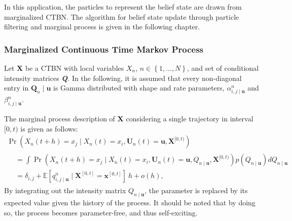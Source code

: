 In this application, the particles to represent the belief state are drawn from marginalized CTBN. The algorithm for belief state update through particle filtering and marginal process is given in the following chapter.
\subsubsection{Marginalized Continuous Time Markov Process}
Let \textbf{X} be a CTBN with local variables $ X_n $, $ n\in \left\lbrace 1,...,N \right\rbrace $, and set of conditional intensity matrices \textbf{\textit{Q}}. In the following, it is assumed that every non-diagonal entry in $ \textbf{Q}_{n}\mid \textbf{u} $ is Gamma distributed with shape and rate parameters, $ \alpha^n_{i,j\mid \textbf{u}} $ and $ \beta^n_{i,j\mid \textbf{u}} $.

The marginal process description of \textbf{X} considering a single trajectory in interval $ [0,t) $ is given as follows:
\begin{multline}
\operatorname{Pr}(X_n(t + h) = x_j \mid X_n(t)=x_i, \textbf{U}_n(t)=\textbf{u}, \textbf{X}^{[0, t)})\\
\begin{split}
&= \int \operatorname{Pr}(X_n(t + h) = x_j \mid X_n(t)=x_i, \textbf{U}_n(t)=\textbf{u}, Q_{n\mid \textbf{u}}, \textbf{X}^{[0, t)})p(Q_{n\mid \textbf{u}})dQ_{n\mid \textbf{u}}\\
&= \delta_{i,j} + \mathbb{E}[q^n_{i,j\mid \textbf{u}} \mid \textbf{X}^{[0, t]} = \textbf{x}^{[0, t]}]\ h + o(h),
\end{split}
\label{eq:marginal_CTBN}
\end{multline}
By integrating out the intensity matrix $ Q_{n\mid \textbf{u}} $, the parameter is replaced by its expected value given the history of the process. It should be noted that by doing so, the process becomes parameter-free, and thus self-exciting. 

